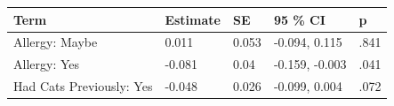 \documentclass[
  man,
  longtable,
  nolmodern,
  notxfonts,
  notimes,
  colorlinks=true,linkcolor=blue,citecolor=blue,urlcolor=blue]{apa7}
\begin{document}
\begin{table}

{\caption{{Effect of having an allergy on positive information recall in
recognition task.}{\label{tbl-sig-covar}}}
\vspace{-20pt}}

\begin{longtable}[]{@{}lllll@{}}
\toprule\noalign{}
Term & Estimate & SE & 95 \% CI & p \\
\midrule\noalign{}
\endhead
\bottomrule\noalign{}
\endlastfoot
Allergy: Maybe & 0.011 & 0.053 & -0.094, 0.115 & .841 \\
Allergy: Yes & -0.081 & 0.04 & -0.159, -0.003 & .041 \\
Had Cats Previously: Yes & -0.048 & 0.026 & -0.099, 0.004 & .072 \\
\end{longtable}

\end{table}
\end{document}
